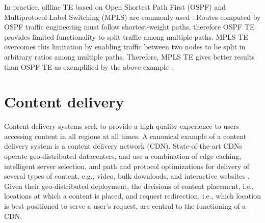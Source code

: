 In practice, offline TE based on Open Shortest Path First (OSPF) and Multiprotocol Label Switching (MPLS) are commonly used  \cite{COPE,MultiTM,fortz2000internet,MPLS2}. Routes computed by OSPF traffic engineering must follow shortest-weight paths, therefore OSPF TE provides limited functionality to split traffic among multiple paths. MPLS TE overcomes this limitation by enabling traffic between two nodes to be split  in arbitrary ratios among multiple paths. Therefore, MPLS TE gives better results than OSPF TE as exemplified by the above example \cite{COPE,MultiTM}.



%
%
%



\section{Content delivery}

Content delivery systems seek to provide a high-quality experience to users accessing content in all regions  at all times. A canonical example of a content delivery system is a content delivery network (CDN). State-of-the-art CDNs operate geo-distributed datacenters, and use a combination of edge caching, intelligent server selection, and path and protocol optimizations for delivery of several types of content, e.g., video, bulk downloads, and interactive websites \cite{DilleyMPPSW02,akamai-overview}. Given their geo-distributed deployment, the decisions of content placement, i.e., locations at which a content is placed, and request redirection, i.e., which location is best positioned to serve a user's request, are central to the functioning of a CDN.


